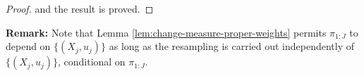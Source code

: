 \documentclass{article}
\begin{document}
\begin{proof}
    and the result is proved. 


    
    
\end{proof}


\textbf{Remark:} Note that Lemma \ref{lem:change-measure-proper-weights} permits $\pi_{1:J}$ to depend on $\{(X_j,u_j)\}$ as long as the resampling is carried out independently of $\{(X_j,u_j)\}$, conditional on $\pi_{1:J}$.
\end{document}
